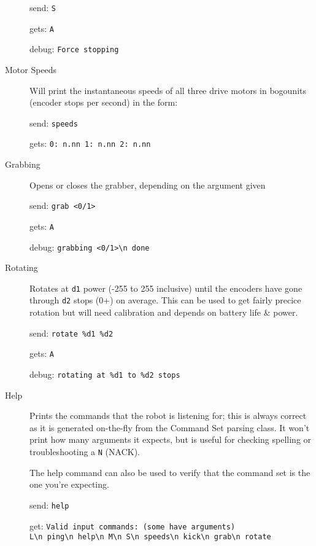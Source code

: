\begin{description}
  send: \verb|S|

  gets: \verb|A|

  debug: \verb|Force stopping|

  
\item[Motor Speeds]
  Will print the instantaneous speeds of all three drive motors in bogounits (encoder stops per second) in the form:

  send: \verb|speeds|
  
  gets: \verb|0: n.nn 1: n.nn 2: n.nn|


\item[Grabbing]
  Opens or closes the grabber, depending on the argument given

  send: \verb|grab <0/1>|

  gets: \verb|A|

  debug: \verb|grabbing <0/1>\n done|


\item[Rotating]
  Rotates at \texttt{d1} power (-255 to 255 inclusive) until the encoders have gone through \texttt{d2} stops (0+) on average. This can be used to get fairly precice rotation but will need calibration and depends on battery life \& power.

  send: \verb|rotate %d1 %d2|

  gets: \verb|A|

  debug: \verb|rotating at %d1 to %d2 stops|


\item[Help]
  Prints the commands that the robot is listening for; this is always correct as it is generated on-the-fly from the Command Set parsing class. It won't print how many arguments it expects, but is useful for checking spelling or troubleshooting a \texttt{N} (NACK).

  The help command can also be used to verify that the command set is the one you're expecting.

  send: \verb|help|

  get: \verb|Valid input commands: (some have arguments)|\\
  \verb|L\n ping\n help\n M\n S\n speeds\n kick\n grab\n rotate|

\end{description}
